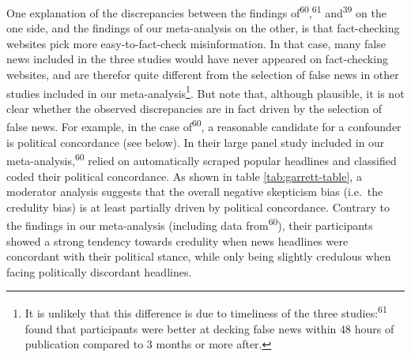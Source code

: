 \documentclass[
  doc,floatsintext]{apa6}
\begin{document}
One explanation of the discrepancies between the findings of\textsuperscript{60},\textsuperscript{61} and\textsuperscript{39} on the one side, and the findings of our meta-analysis on the other, is that fact-checking websites pick more easy-to-fact-check misinformation. In that case, many false news included in the three studies would have never appeared on fact-checking websites, and are therefor quite different from the selection of false news in other studies included in our meta-analysis\footnote{It is unlikely that this difference is due to timeliness of the three studies:\textsuperscript{61} found that participants were better at decking false news within 48 hours of publication compared to 3 months or more after.}. But note that, although plausible, it is not clear whether the observed discrepancies are in fact driven by the selection of false news. For example, in the case of\textsuperscript{60}, a reasonable candidate for a confounder is political concordance (see below). In their large panel study included in our meta-analysis,\textsuperscript{60} relied on automatically scraped popular headlines and classified coded their political concordance. As shown in table \ref{tab:garrett-table}, a moderator analysis suggests that the overall negative skepticism bias (i.e.~the credulity bias) is at least partially driven by political concordance. Contrary to the findings in our meta-analysis (including data from\textsuperscript{60}), their participants showed a strong tendency towards credulity when news headlines were concordant with their political stance, while only being slightly credulous when facing politically discordant headlines.
\end{document}
